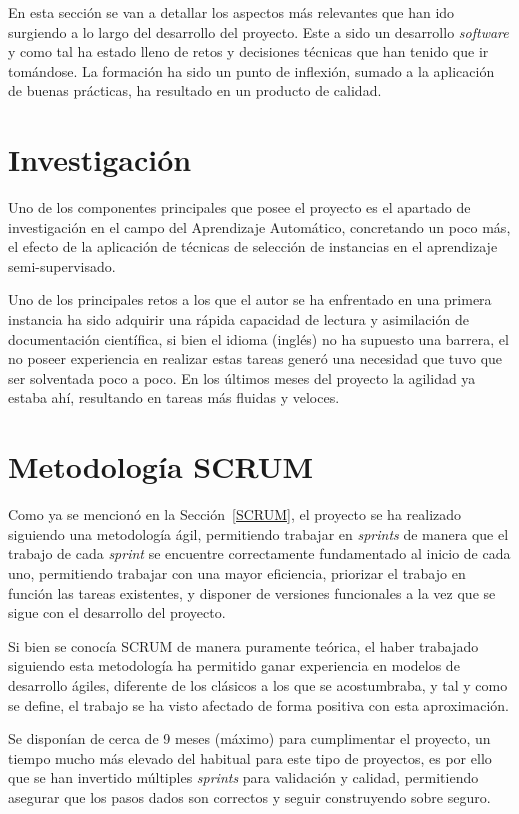 
En esta sección se van a detallar los aspectos más relevantes que han ido surgiendo a lo largo del desarrollo del proyecto. Este a sido un desarrollo \textit{software} y como tal ha estado lleno de retos y decisiones técnicas que han tenido que ir tomándose. La formación ha sido un punto de inflexión, sumado a la aplicación de buenas prácticas, ha resultado en un producto de calidad.


\section{Investigación}
Uno de los componentes principales que posee el proyecto es el apartado de investigación en el campo del Aprendizaje Automático, concretando un poco más, el efecto de la aplicación de técnicas de selección de instancias en el aprendizaje semi-supervisado.

Uno de los principales retos a los que el autor se ha enfrentado en una primera instancia ha sido adquirir una rápida capacidad de lectura y asimilación de documentación científica, si bien el idioma (inglés) no ha supuesto una barrera, el no poseer experiencia en realizar estas tareas  generó una necesidad que tuvo que ser solventada poco a poco. En los últimos meses del proyecto la agilidad ya estaba ahí, resultando en tareas más fluidas y veloces.

\section{Metodología SCRUM}
Como ya se mencionó en la Sección~\ref{SCRUM}, el proyecto se ha realizado siguiendo una metodología ágil, permitiendo trabajar en \textit{sprints} de manera que el trabajo de cada \textit{sprint} se encuentre correctamente fundamentado al inicio de cada uno, permitiendo trabajar con una mayor eficiencia, priorizar el trabajo en función las tareas existentes, y disponer de versiones funcionales a la vez que se sigue con el desarrollo del proyecto.

Si bien se conocía SCRUM de manera puramente teórica, el haber trabajado siguiendo esta metodología ha permitido ganar experiencia en modelos de desarrollo ágiles, diferente de los clásicos a los que se acostumbraba, y tal y como se define, el trabajo se ha visto afectado de forma positiva con esta aproximación.

Se disponían de cerca de 9 meses (máximo) para cumplimentar el proyecto, un tiempo mucho más elevado del habitual para este tipo de proyectos, es por ello que se han invertido múltiples \textit{sprints} para validación y calidad, permitiendo asegurar que los pasos dados son correctos y seguir construyendo sobre seguro.

